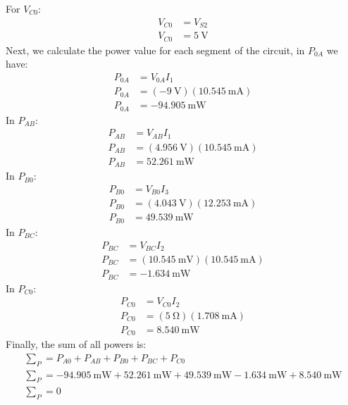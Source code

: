 \documentclass[a4paper]{article}
\begin{document}
For $V_{C0}$:
\begin{align*}
    V_{C0}&=V_{S2}\\
    V_{C0}&=\SI{5}{\volt}
\end{align*}
Next, we calculate the power value for each segment of the circuit, in $P_{0A}$ we have:
\begin{align*}
    P_{0A}&=V_{0A}I_1\\
    P_{0A}&=(-\SI{9}{\volt})(\SI{10.545}{\milli\ampere})\\
    P_{0A}&=\SI{-94.905}{\milli\watt}
\end{align*}
In $P_{AB}$:
\begin{align*}
    P_{AB}&=V_{AB}I_1\\
    P_{AB}&=(\SI{4.956}{\volt})(\SI{10.545}{\milli\ampere})\\
    P_{AB}&=\SI{52.261}{\milli\watt}
\end{align*}
In $P_{B0}$:
\begin{align*}
    P_{B0}&=V_{B0}I_3\\
    P_{B0}&=(\SI{4.043}{\volt})(\SI{12.253}{\milli\ampere})\\
    P_{B0}&=\SI{49.539}{\milli\watt}
\end{align*}
In $P_{BC}$:
\begin{align*}
    P_{BC}&=V_{BC}I_2\\
    P_{BC}&=(\SI{10.545}{\milli\volt})(\SI{10.545}{\milli\ampere})\\
    P_{BC}&=\SI{-1.634}{\milli\watt}
\end{align*}
In $P_{C0}$:
\begin{align*}
    P_{C0}&=V_{C0}I_2\\
    P_{C0}&=(\SI{5}{\ohm})(\SI{1.708}{\milli\ampere})\\
    P_{C0}&=\SI{8.540}{\milli\watt}
\end{align*}
Finally, the sum of all powers is:
\begin{gather*}
    \sum\nolimits_{P}=P_{A0}+P_{AB}+P_{B0}+P_{BC}+P_{C0}\\
    \sum\nolimits_{P}=\SI{-94.905}{\milli\watt}+\SI{52.261}{\milli\watt}+\SI{49.539}{\milli\watt}-\SI{1.634}{\milli\watt}+\SI{8.540}{\milli\watt}\\
    \sum\nolimits_{P}=0
\end{gather*}
\end{document}

